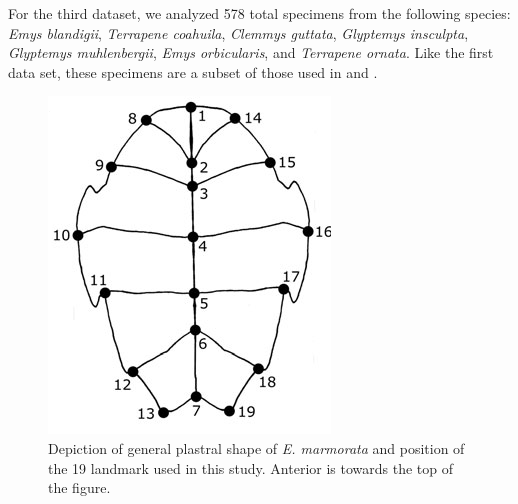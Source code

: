 \documentclass[12pt,letterpaper]{article}
\begin{document}

For the third dataset, we analyzed 578 total specimens from the following species: \textit{Emys blandigii}, \textit{Terrapene coahuila}, \textit{Clemmys guttata}, \textit{Glyptemys insculpta}, \textit{Glyptemys muhlenbergii}, \textit{Emys orbicularis}, and \textit{Terrapene ornata}. Like the first data set, these specimens are a subset of those used in \citet{Angielczyk2011} and \citet{Angielczyk2013a}.


\begin{figure}[h]
  \centering
  \includegraphics[height = 0.5\textheight, width = \textwidth, keepaspectratio = true]{figure/plastra}
  \caption{Depiction of general plastral shape of \textit{E. marmorata} and position of the 19 landmark used in this study. Anterior is towards the top of the figure.}
  \label{fig:plastra}
\end{figure}
\end{document}
